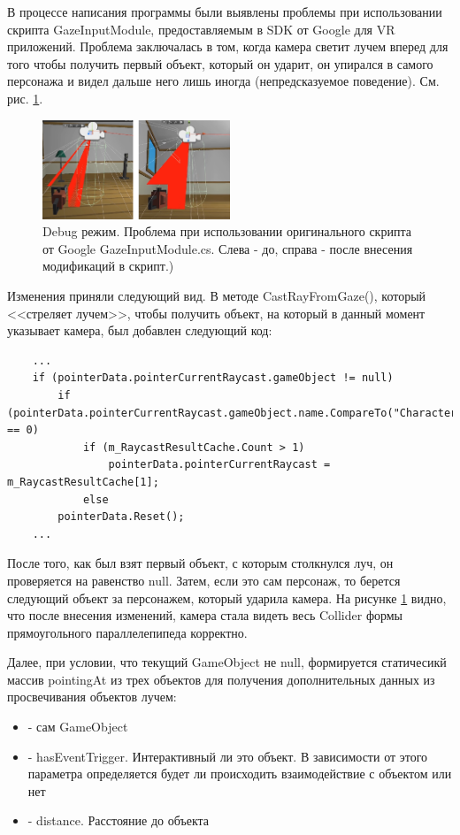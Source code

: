 \tab[0.75cm]В процессе написания программы были выявлены проблемы при использовании скрипта GazeInputModule, предоставляемым в SDK от Google для VR приложений. Проблема заключалась в том, когда камера светит лучем вперед для того чтобы получить первый объект, который он ударит, он упирался в самого персонажа и видел дальше него лишь иногда (непредсказуемое поведение). См. рис. \ref{problem}.

\begin{figure}[h!]
    \centering
    \includegraphics[width=0.5\textwidth]{./screenshots/problem1.png}
    \caption{\small{Debug режим. Проблема при использовании оригинального скрипта от Google GazeInputModule.cs. Слева - до, справа - после внесения модификаций в скрипт.)}}
    \label{problem}
\end{figure} 


Изменения приняли следующий вид. В методе CastRayFromGaze(), который <<стреляет лучем>>, чтобы получить объект, на который в данный момент указывает камера, был добавлен следующий код:

\begin{small}
    \begin{verbatim}
    ...
    if (pointerData.pointerCurrentRaycast.gameObject != null)
        if (pointerData.pointerCurrentRaycast.gameObject.name.CompareTo("Character") == 0)
            if (m_RaycastResultCache.Count > 1)
                pointerData.pointerCurrentRaycast = m_RaycastResultCache[1];
            else
        pointerData.Reset();
    ...
    \end{verbatim}
\end{small}

После того, как был взят первый объект, с которым столкнулся луч, он проверяется на равенство null. Затем, если это сам персонаж, то берется следующий объект за персонажем, который ударила камера. На рисунке \ref{problem} видно, что после внесения изменений, камера стала видеть весь Collider формы прямоугольного параллелепипеда корректно. 

Далее, при условии, что текущий GameObject не null, формируется статичесикй массив pointingAt из трех объектов для получения дополнительных данных из просвечивания объектов лучем:
\begin{itemize}
    \item [0] - сам GameObject
    \item [1] - hasEventTrigger. Интерактивный ли это объект. В зависимости от этого параметра определяется будет ли происходить взаимодействие с объектом или нет
    \item [2] - distance. Расстояние до объекта
\end{itemize}

